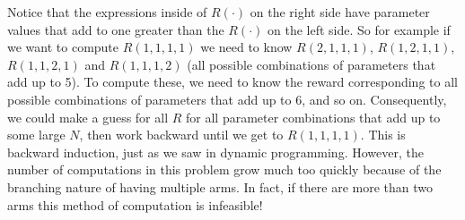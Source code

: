 Notice that the expressions inside of $R(\cdot)$ on the right side have parameter values that add to one greater than the $R(\cdot)$ on the left side.  So for example if we want to compute $R(1,1,1,1)$ we need to know $R(2,1,1,1)$, $R(1,2,1,1)$, $R(1,1,2,1)$ and $R(1,1,1,2)$ (all possible combinations of parameters that add up to 5).  To compute these, we need to know the reward corresponding to all possible combinations of parameters that add up to 6, and so on.  Consequently, we could make a guess for all $R$ for all parameter combinations that add up to some large $N$, then work backward until we get to $R(1,1,1,1)$.  This is backward induction, just as we saw in dynamic programming.  However, the number of computations in this problem grow much too quickly because of the branching nature of having multiple arms.  In fact, if there are more than two arms this method of computation is infeasible!


